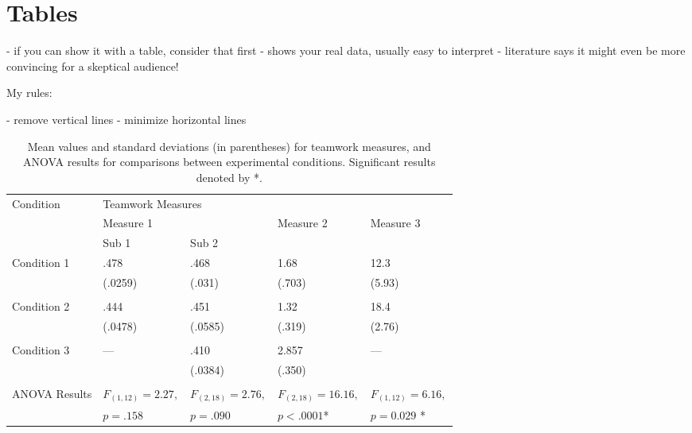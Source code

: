 \section{Tables}

- if you can show it with a table, consider that first
- shows your real data, usually easy to interpret
- literature says it might even be more convincing for a skeptical audience! \cite{pandey2014persuasive}


My rules:

- remove vertical lines
- minimize horizontal lines

\begin{center}
\begin{table*}[htbp!]
\small
\begin{center}
\begin{tabular}{l l l l l}
\toprule
Condition & \multicolumn{4}{l}{Teamwork Measures}\\
\cmidrule(r){2-5}
& \multicolumn{2}{l}{Measure 1} & Measure 2 & Measure 3 \\
\cmidrule(r){2-3} 
&  Sub 1 & Sub 2 &  \\ 


\midrule


Condition 1 & .478 & .468 & 1.68 & 12.3  \\
                  & (.0259) & (.031) & (.703) & (5.93) \\
\\

Condition 2 & .444 & .451 & 1.32 & 18.4 \\
                              & (.0478) & (.0585) & (.319) & (2.76) \\
\\

Condition 3 & --- & .410 &  2.857 & --- \\
                     &        & (.0384)  & (.350) & \\
\\


ANOVA Results & $F_{(1,12)} = 2.27,$ & $F_{(2,18)} = 2.76,$  & $F_{(2,18)} = 16.16,$ & $F_{(1,12)} = 6.16,$ \\
                          & $p = .158$ & $p = .090  $ &  $p < .0001$* &  $p = 0.029$ * \\
\bottomrule
\end{tabular}

\caption[a]{Mean values and standard deviations (in parentheses) for teamwork measures, and ANOVA results for comparisons between experimental conditions. Significant results denoted by *.}
\label{tab:bpf_teamwork_results}
\end{center}
\end{table*}
\end{center}